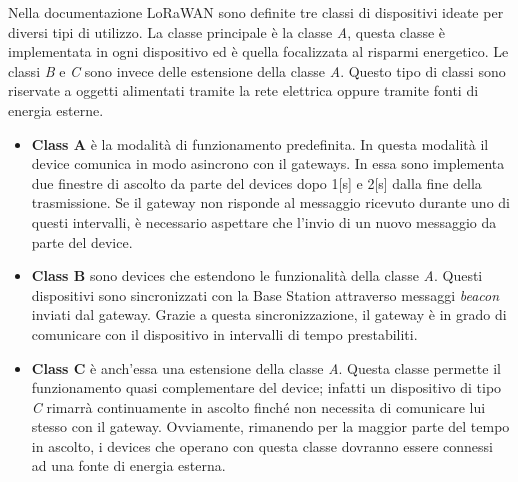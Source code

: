 Nella documentazione LoRaWAN sono definite tre classi di dispositivi ideate per 
diversi tipi di utilizzo. La classe principale è la classe \emph{A}, questa
classe è implementata in ogni dispositivo ed è quella focalizzata al risparmi
energetico. Le classi \emph{B} e
\emph{C} sono invece delle estensione della classe \emph{A}. Questo tipo di classi sono
riservate a oggetti  alimentati tramite la rete elettrica oppure tramite 
fonti di energia esterne.  
\begin{itemize}
        \item   \textbf{Class A} è la modalità di funzionamento predefinita. 
                In questa modalità il device comunica in modo asincrono con il
                gateways. In essa sono implementa due finestre di ascolto da parte del devices
                dopo 1[s] e 2[s] dalla fine della trasmissione. Se il gateway non risponde al
                messaggio ricevuto durante uno di questi intervalli, è necessario aspettare che
                l'invio di un nuovo messaggio da parte del device.

        \item   \textbf{Class B} sono devices che estendono le funzionalità della classe
                \emph{A}. Questi dispositivi sono sincronizzati con la Base Station attraverso
                messaggi \emph{beacon} inviati dal gateway. Grazie a questa
                sincronizzazione, il gateway è in grado di comunicare con il
                dispositivo in intervalli di tempo prestabiliti.

        \item   \textbf{Class C} è anch'essa una estensione della classe \emph{A}. 
                Questa classe permette il funzionamento quasi complementare del device; infatti
                un  dispositivo di tipo \emph{C} rimarrà continuamente in ascolto finché non
                necessita di comunicare lui stesso con il gateway. Ovviamente, rimanendo per la
                maggior parte del tempo in ascolto, i devices che operano con questa classe
                dovranno essere connessi ad una fonte di energia esterna. 
\end{itemize}


